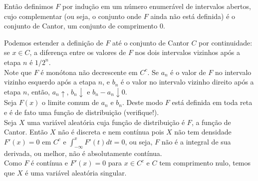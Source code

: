 \begin{frame}
\begin{block}{}
%
%
Então definimos $F$ por indução em um número enumerável de intervalos abertos, cujo complementar (ou seja, o conjunto onde $F$ ainda não está definida) é o conjunto de Cantor, um conjunto de comprimento 0.
 
\medskip
Podemos estender a definição de $F$ até o conjunto de Cantor $C$ por continuidade: se $x\in C$, a diferença entre os valores de $F$ nos dois intervalos vizinhos após a etapa $n$ é $1/2^n$.\\ 

\medskip
Note que $F$ é monótona não decrescente em $C^c$. Se $a_n$ é o valor de $F$ no intervalo vizinho esquerdo após a etapa $n$, e $b_n$ é o valor no intervalo vizinho direito após a etapa $n$, então, $a_n\uparrow$, $b_n\downarrow$ e $b_n-a_n\downarrow 0$. \\

\medskip
Seja $F(x)$ o limite comum de $a_n$ e $b_n$. Deste modo $F$ está definida em toda reta e é de fato uma função de distribuição (verifique!).\\

\medskip
Seja $X$ uma variável aleatória cuja função de distribuição é $F$, a função de Cantor. Então $X$ não é discreta e nem contínua pois $X$ não tem densidade $F'(x)=0$ em $C^c$ e $\int_{-\infty}^{x}F'(t)dt=0$, ou seja, $F$ não é a integral de sua derivada, ou melhor, não é absolutamente contínua. \\

\medskip
Como $F$ é contínua e $F'(x)=0$ para $x\in C^c$ e $C$ tem comprimento nulo, temos que $X$ é uma variável aleatória singular.

\end{block}
\end{frame}
%
